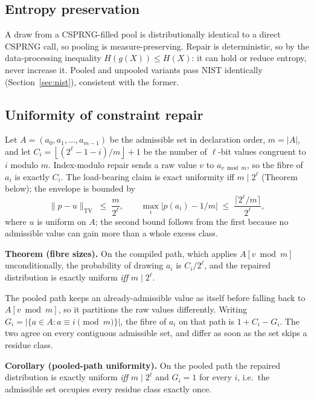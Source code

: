 \documentclass{svproc}
\begin{document}
\subsection{Entropy preservation}
\label{sec:entropy}

A draw from a CSPRNG-filled pool is distributionally identical to a direct
CSPRNG call, so pooling is measure-preserving. Repair is deterministic, so
by the data-processing inequality $H(g(X)) \leq H(X)$: it can hold or
reduce entropy, never increase it. Pooled and unpooled variants pass NIST
identically (Section~\ref{sec:nist}), consistent with the former.

\subsection{Uniformity of constraint repair}
\label{sec:uniformity}

Let $A = (a_0, a_1, \dots, a_{m-1})$ be the admissible set in declaration order, $m = |A|$, and let $C_i = \left\lfloor (2^\ell - 1 - i)/m \right\rfloor + 1$ be the number of $\ell$-bit values congruent to $i$ modulo $m$. Index-modulo repair sends a raw value $v$ to $a_{v \bmod m}$, so the fibre of $a_i$ is exactly $C_i$. The load-bearing claim is exact uniformity iff $m \mid 2^\ell$ (Theorem below); the envelope is bounded by
\[
  \|p - u\|_{\mathrm{TV}} \;\le\; \frac{m}{2^\ell}, \qquad
  \max_i |p(a_i) - 1/m| \;\le\; \frac{\lceil 2^\ell/m \rceil}{2^\ell},
\]
where $u$ is uniform on $A$; the second bound follows from the first because no admissible value can gain more than a whole excess class.

\textbf{Theorem (fibre sizes).} On the compiled path, which applies $A[v \bmod m]$ unconditionally, the probability of drawing $a_i$ is $C_i / 2^\ell$, and the repaired distribution is exactly uniform \emph{iff} $m \mid 2^\ell$.

The pooled path keeps an already-admissible value as itself before falling back to $A[v \bmod m]$, so it partitions the raw values differently. Writing $G_i = |\{a \in A : a \equiv i \pmod m\}|$, the fibre of $a_i$ on that path is $1 + C_i - G_i$. The two agree on every contiguous admissible set, and differ as soon as the set skips a residue class.

\textbf{Corollary (pooled-path uniformity).} On the pooled path the repaired distribution is exactly uniform \emph{iff} $m \mid 2^\ell$ and $G_i = 1$ for every $i$, i.e.\ the admissible set occupies every residue class exactly once.
\end{document}
